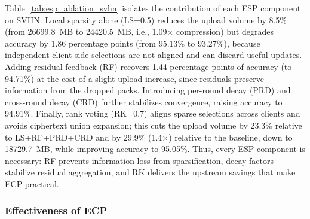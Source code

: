 Table~\ref{tab:esp_ablation_svhn} isolates the contribution of each ESP component on SVHN.
Local sparsity alone (LS=0.5) reduces the upload volume by 8.5\% (from 26699.8~MB to 24420.5~MB, i.e., 1.09$\times$ compression) but degrades accuracy by 1.86 percentage points (from 95.13\% to 93.27\%), because independent client-side selections are not aligned and can discard useful updates.
Adding residual feedback (RF) recovers 1.44 percentage points of accuracy (to 94.71\%) at the cost of a slight upload increase, since residuals preserve information from the dropped packs. Introducing per-round decay (PRD) and cross-round decay (CRD) further stabilizes convergence, raising accuracy to 94.91\%.
Finally, rank voting (RK=0.7) aligns sparse selections across clients and avoids ciphertext union expansion; this cuts the upload volume by 23.3\% relative to LS+RF+PRD+CRD and by 29.9\% (1.4$\times$) relative to the baseline, down to 18729.7~MB, while improving accuracy to 95.05\%.
Thus, every ESP component is necessary: RF prevents information loss from sparsification, decay factors stabilize residual aggregation, and RK delivers the upstream savings that make ECP practical.

\subsubsection{Effectiveness of ECP}

\begin{table}[t]
\centering
\caption{Client Communication and Prefetch Overhead (CIFAR-10, Union, $R=3$)}
\label{tab:communication}
\end{table}

